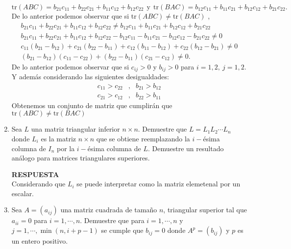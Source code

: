 \documentclass[11pt,letterpaper]{article}
\newcommand{\res}{\textbf{RESPUESTA}\\}
\newcommand{\tr}{\text{tr}}
\begin{document}
\begin{enumerate}
\begin{equation*}
\tr (ABC)= b_{21}c_{11}+b_{22}c_{21}+b_{11}c_{12}+b_{12}c_{22}\ \ \text{y}\ \ \tr (BAC)= b_{12}c_{11}+b_{11}c_{21}+ b_{12}c_{12}+b_{21}c_{22}.
\end{equation*}
De lo anterior podemos observar que si tr$(ABC)\neq$tr$(BAC)$ ,
\begin{equation*}
\begin{array}{ccc}
b_{21}c_{11}+b_{22}c_{21}+b_{11}c_{12}+b_{12}c_{22} \neq 
b_{12}c_{11}+b_{11}c_{21}+ b_{12}c_{12}+b_{21}c_{22}\\
b_{21}c_{11}+b_{22}c_{21}+b_{11}c_{12}+b_{12}c_{22}-b_{12}c_{11}-b_{11}c_{21}-b_{12}c_{12}-b_{21}c_{22}\neq 0\\
c_{11}(b_{21}-b_{12})+c_{21}(b_{22}-b_{11})+c_{12}(b_{11}-b_{12})+c_{22}(b_{12}-b_{21})\neq 0\\
(b_{21}-b_{12})(c_{11}-c_{22})+(b_{22}-b_{11})(c_{21}-c_{12})\neq 0.
\end{array}
\end{equation*}
De lo anterior podemos observar que si $c_{ij}>0$ y $b_{ij}>0$ para $i=1,2, \ j=1,2$. Y además considerando las siguientes desigualdades:
\begin{equation*}
\begin{array}{ccc}
c_{11}>c_{22} &,& b_{21}>b_{12}\\
c_{21}>c_{12} &,& b_{22}>b_{11}
\end{array}
\end{equation*} 
Obtenemos un conjunto de matriz que cumplirán que $\tr(ABC)\neq \tr(BAC)$

\item Sea $L$ una matriz triangular inferior $n\times n$. Demuestre que $L=L_1L_2\cdots L_n$ donde $L_i$ es la matriz $n\times n$ que se obtiene reemplazando la $i-$ésima columna de $I_n$ por la $i-$ésima columna de $L$. Demuestre un resultado análogo para matrices triangulares superiores.

\res
Considerando que $L_i$ se puede interpretar como la matriz elemetenal por un escalar.

\item Sea $A=(a_{ij})$ una matriz cuadrada de tamaño $n$, triangular superior tal que $a_{ii}=0$ para $i=1, \cdots , n.$ Demuestre que para $i=1, \cdots , n$ y $j=1, \cdots , \min (n,i+p-1)$ se cumple que $b_{ij}=0$ donde $A^p=(b_{ij})$ y $p$ es un entero positivo. 


\end{enumerate}
\end{document}
